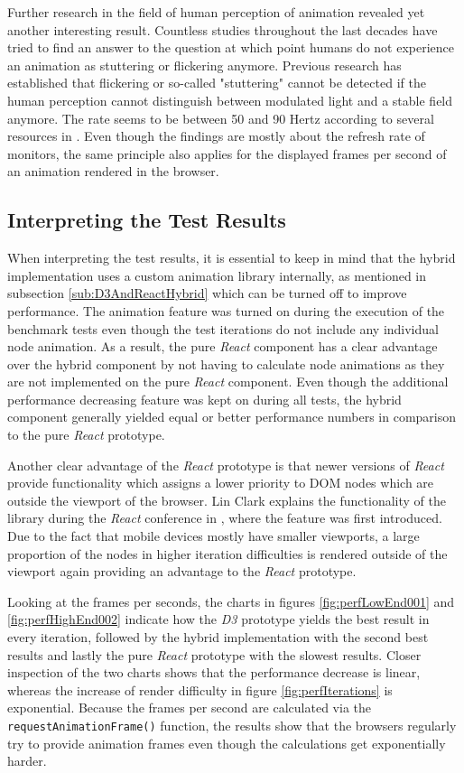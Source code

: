 Further research in the field of human perception of animation revealed yet another interesting result. Countless studies throughout the last decades have tried to find an answer to the question at which point humans do not experience an animation as stuttering or flickering anymore. Previous research has established that flickering or so-called "stuttering" cannot be detected if the human perception cannot distinguish between modulated light and a stable field anymore. The rate seems to be between 50 and 90 Hertz according to several resources in \cite{6375944,farrell1987predicting,stereoscopicFlickerArticle}. Even though the findings are mostly about the refresh rate of monitors, the same principle also applies for the displayed frames per second of an animation rendered in the browser.

\subsection{Interpreting the Test Results}

When interpreting the test results, it is essential to keep in mind that the hybrid implementation uses a custom animation library internally, as mentioned in subsection \ref{sub:D3AndReactHybrid} which can be turned off to improve performance. The animation feature was turned on during the execution of the benchmark tests even though the test iterations do not include any individual node animation. As a result, the pure \emph{React} component has a clear advantage over the hybrid component by not having to calculate node animations as they are not implemented on the pure \emph{React} component. Even though the additional performance decreasing feature was kept on during all tests, the hybrid component generally yielded equal or better performance numbers in comparison to the pure \emph{React} prototype.

Another clear advantage of the \emph{React} prototype is that newer versions of \emph{React} provide functionality which assigns a lower priority to DOM nodes which are outside the viewport of the browser. Lin Clark explains the functionality of the library during the \emph{React} conference in \cite{ReactReconcliliationVideo}, where the feature was first introduced. Due to the fact that mobile devices mostly have smaller viewports, a large proportion of the nodes in higher iteration difficulties is rendered outside of the viewport again providing an advantage to the \emph{React} prototype.

Looking at the frames per seconds, the charts in figures \ref{fig:perfLowEnd001} and \ref{fig:perfHighEnd002} indicate how the \emph{D3} prototype yields the best result in every iteration, followed by the hybrid implementation with the second best results and lastly the pure \emph{React} prototype with the slowest results. Closer inspection of the two charts shows that the performance decrease is linear, whereas the increase of render difficulty in figure \ref{fig:perfIterations} is exponential. Because the frames per second are calculated via the \texttt{requestAnimationFrame()} function, the results show that the browsers regularly try to provide animation frames even though the calculations get exponentially harder.

